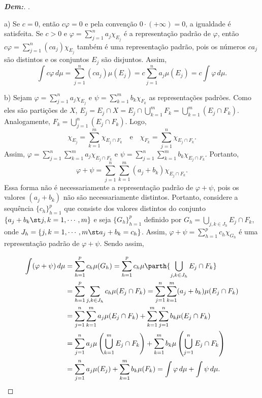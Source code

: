 \begin{proof}[\textbf{Dem:}]. 

\noindent
a) Se $c = 0$, então $c\varphi = 0$ e pela convenção $0 \cdot (+\infty) = 0$, a igualdade é satisfeita. Se $c > 0$ e $\varphi = \sum_{j=1}^n a_j \chi_{E_j}$ é a representação padrão de $\varphi$, então $c\varphi = \sum_{j=1}^n (ca_j) \chi_{E_j}$ também é uma representação padrão, pois os números $ca_j$ são distintos e os conjuntos $E_j$ são disjuntos. Assim,
$$ \int c\varphi \, d\mu = \sum_{j=1}^n (ca_j) \mu(E_j) = c \sum_{j=1}^n a_j \mu(E_j) = c \int \varphi \, d\mu. $$

\noindent
b) Sejam $\varphi = \sum_{j=1}^n a_j \chi_{E_j}$ e $\psi = \sum_{k=1}^m b_k \chi_{F_k}$ as representações padrões. Como eles são partições de $X$, $E_j = E_j \cap X = E_j \cap \bigcup_{k=1}^m F_k = \bigcup_{k=1}^m (E_j \cap F_k)$. Analogamente, $F_k = \bigcup_{j=1}^n (E_j \cap F_k)$. Logo,
$$ \chi_{E_j} = \sum_{k=1}^m \chi_{E_j \cap F_k} \quad \text{e} \quad \chi_{F_k} = \sum_{j=1}^n \chi_{E_j \cap F_k}. $$
Assim, $\varphi = \sum_{j=1}^n \sum_{k=1}^m a_j \chi_{E_j \cap F_k}$ e $\psi = \sum_{j=1}^n \sum_{k=1}^m b_k \chi_{E_j \cap F_k}$. Portanto,
$$ \varphi + \psi = \sum_{j=1}^n \sum_{k=1}^m (a_j + b_k) \chi_{E_j \cap F_k}. $$
  Essa forma não é necessariamente a representação padrão de $\varphi + \psi$, 
  pois os valores $(a_j + b_k)$ não são necessariamente distintos.
  Portanto, considere a sequência $\{c_h\}_{h=1}^p$ que consiste dos valores distintos 
  do conjunto $\{a_j + b_k \st j, k = 1, \cdots, m\}$ e seja $\{G_h\}_{h=1}^p$ definido por 
  $G_h = \bigcup\limits_{j, k \in J_h} E_j \cap F_k$, onde $J_h = \{j,k = 1, \cdots, m \st 
  a_j + b_k = c_h\}$. Assim, $\varphi + \psi = \sum_{h= 1}^p c_h \chi_{G_h}$ 
  é uma representação padrão de $\varphi + \psi$. Sendo assim,

\begin{align*}
  \int (\varphi + \psi) \, d\mu &= \sum_{h=1}^p c_h \mu(G_h) =
    \sum_{h=1}^p c_h \mu\parth{\bigcup_{j, k \in J_h} E_j \cap F_k} \\
    &= \sum_{h=1}^p  \sum_{j, k \in J_h} c_h \mu(E_j \cap F_k)=
    \sum_{j=1}^n \sum_{k=1}^m (a_j + b_k) \mu(E_j \cap F_k) \\
    &= \sum_{j=1}^n \sum_{k=1}^m a_j \mu(E_j \cap F_k) + \sum_{k=1}^m \sum_{j=1}^n b_k \mu(E_j \cap F_k) \\
    &= \sum_{j=1}^n a_j \mu\left(\bigcup_{k=1}^m E_j \cap F_k\right) + \sum_{k=1}^m b_k \mu\left(\bigcup_{j=1}^n E_j \cap F_k\right) \\
    &= \sum_{j=1}^n a_j \mu(E_j) + \sum_{k=1}^m b_k \mu(F_k) = \int \varphi \, d\mu + \int \psi \, d\mu.
\end{align*}


\end{proof}
